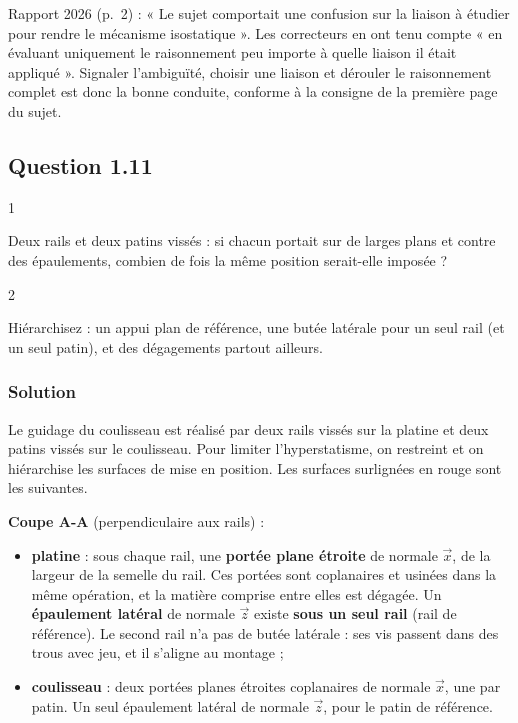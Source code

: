\documentclass[11pt,a4paper]{article}
\providecommand{\tightlist}{\setlength{\itemsep}{0pt}\setlength{\parskip}{0pt}}
\begin{document}
\begin{jury}

Rapport 2026 (p.~2) : « Le sujet comportait une confusion sur la liaison à étudier pour rendre le mécanisme isostatique ». Les correcteurs en ont tenu compte « en évaluant uniquement le raisonnement peu importe à quelle liaison il était appliqué ». Signaler l'ambiguïté, choisir une liaison et dérouler le raisonnement complet est donc la bonne conduite, conforme à la consigne de la première page du sujet.

\end{jury}

\hypertarget{question-1.11}{%
\subsection{Question 1.11}\label{question-1.11}}

\begin{indication}{1}

Deux rails et deux patins vissés : si chacun portait sur de larges plans et contre des épaulements, combien de fois la même position serait-elle imposée ?

\end{indication}

\begin{indication}{2}

Hiérarchisez : un appui plan de référence, une butée latérale pour un seul rail (et un seul patin), et des dégagements partout ailleurs.

\end{indication}

\hypertarget{solution-10}{%
\subsubsection{Solution}\label{solution-10}}

Le guidage du coulisseau est réalisé par deux rails vissés sur la platine et deux patins vissés sur le coulisseau. Pour limiter l'hyperstatisme, on restreint et on hiérarchise les surfaces de mise en position. Les surfaces surlignées en rouge sont les suivantes.

\textbf{Coupe A-A} (perpendiculaire aux rails) :

\begin{itemize}
\tightlist
\item
  \textbf{platine} : sous chaque rail, une \textbf{portée plane étroite} de normale \(\vec x\), de la largeur de la semelle du rail. Ces portées sont coplanaires et usinées dans la même opération, et la matière comprise entre elles est dégagée. Un \textbf{épaulement latéral} de normale \(\vec z\) existe \textbf{sous un seul rail} (rail de référence). Le second rail n'a pas de butée latérale : ses vis passent dans des trous avec jeu, et il s'aligne au montage ;
\item
  \textbf{coulisseau} : deux portées planes étroites coplanaires de normale \(\vec x\), une par patin. Un seul épaulement latéral de normale \(\vec z\), pour le patin de référence.
\end{itemize}
\end{document}

